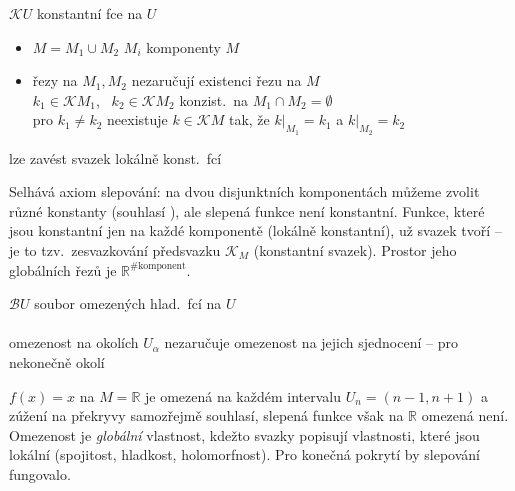 \newpage
{}
\begin{priklad}
$\mathcal{K}U$ \quad konstantní fce na $U$ \\
\begin{itemize}[nosep]
  \item[] $M = M_1\cup M_2$ \qquad $M_i$ komponenty $M$
  \item[] řezy na $M_1, M_2$ nezaručují existenci řezu na $M$ \\
          $k_1\in\mathcal{K}M_1$, \ $k_2\in\mathcal{K}M_2$ \quad konzist.\ na $M_1\cap M_2 = \emptyset$ \\
          pro $k_1\neq k_2$  neexistuje $k\in\mathcal{K}M$ tak, že
          $k|_{M_1} = k_1$ a $k|_{M_2} = k_2$
\end{itemize}
lze zavést svazek lokálně konst.\ fcí
\end{priklad}

\begin{vysvetleni}
Selhává axiom slepování: na dvou disjunktních komponentách můžeme zvolit různé konstanty (souhlasí ),
ale slepená funkce není konstantní. Funkce, které jsou konstantní jen na každé komponentě (lokálně konstantní), už svazek tvoří --
je to tzv.\ zesvazkování předsvazku $\mathcal{K}_M$ (konstantní svazek). Prostor jeho globálních řezů je $\mathbb{R}^{\#\text{komponent}}$.
\end{vysvetleni}

\begin{priklad}
$\mathcal{B}U$ \quad soubor omezených hlad.\ fcí na $U$ \\
 \\
\quad omezenost na okolích $U_\alpha$ nezaručuje omezenost na jejich sjednocení -- pro nekonečně okolí
\end{priklad}

\begin{vysvetleni}[Příklad]
$f(x)=x$ na $M=\mathbb{R}$ je omezená na každém intervalu $U_n=(n-1,n+1)$ a zúžení na překryvy samozřejmě souhlasí, slepená funkce však na $\mathbb{R}$
omezená není. Omezenost je \emph{globální} vlastnost, kdežto svazky popisují vlastnosti, které jsou lokální (spojitost, hladkost, holomorfnost).
Pro konečná pokrytí by slepování fungovalo.
\end{vysvetleni}

